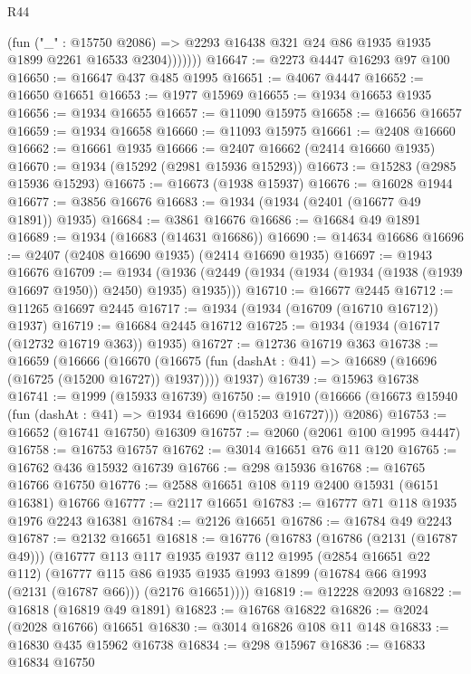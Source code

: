 \begin{lexlean}{R44}
\begin{coremodule}
                (fun ("_" : @15750 @2086) =>
                @2293 @16438 @321 @24 @86 @1935 @1935 @1899 @2261 @16533 @2304)))))))
@16647 := @2273 @4447 @16293 @97 @100
@16650 := @16647 @437 @485 @1995
@16651 := @4067 @4447
@16652 := @16650 @16651
@16653 := @1977 @15969
@16655 := @1934 @16653 @1935
@16656 := @1934 @16655
@16657 := @11090 @15975
@16658 := @16656 @16657
@16659 := @1934 @16658
@16660 := @11093 @15975
@16661 := @2408 @16660
@16662 := @16661 @1935
@16666 := @2407 @16662 (@2414 @16660 @1935)
@16670 := @1934 (@15292 (@2981 @15936 @15293))
@16673 := @15283 (@2985 @15936 @15293)
@16675 := @16673 (@1938 @15937)
@16676 := @16028 @1944
@16677 := @3856 @16676
@16683 := @1934 (@1934 (@2401 (@16677 @49 @1891)) @1935)
@16684 := @3861 @16676
@16686 := @16684 @49 @1891
@16689 := @1934 (@16683 (@14631 @16686))
@16690 := @14634 @16686
@16696 := @2407 (@2408 @16690 @1935) (@2414 @16690 @1935)
@16697 := @1943 @16676
@16709 := @1934
    (@1936 (@2449 (@1934 (@1934 (@1934 (@1938 (@1939 @16697 @1950)) @2450) @1935) @1935)))
@16710 := @16677 @2445
@16712 := @11265 @16697 @2445
@16717 := @1934 (@1934 (@16709 (@16710 @16712)) @1937)
@16719 := @16684 @2445 @16712
@16725 := @1934 (@1934 (@16717 (@12732 @16719 @363)) @1935)
@16727 := @12736 @16719 @363
@16738 := @16659
    (@16666
      (@16670 (@16675 (fun (dashAt : @41) => @16689 (@16696 (@16725 (@15200 @16727)) @1937))))
      @1937)
@16739 := @15963 @16738
@16741 := @1999 (@15933 @16739)
@16750 := @1910 (@16666 (@16673 @15940 (fun (dashAt : @41) => @1934 @16690 (@15203 @16727))) @2086)
@16753 := @16652 (@16741 @16750) @16309
@16757 := @2060 (@2061 @100 @1995 @4447)
@16758 := @16753 @16757
@16762 := @3014 @16651 @76 @11 @120
@16765 := @16762 @436 @15932 @16739
@16766 := @298 @15936
@16768 := @16765 @16766 @16750
@16776 := @2588 @16651 @108 @119 @2400 @15931 (@6151 @16381) @16766
@16777 := @2117 @16651
@16783 := @16777 @71 @118 @1935 @1976 @2243 @16381
@16784 := @2126 @16651
@16786 := @16784 @49 @2243
@16787 := @2132 @16651
@16818 := @16776
    (@16783
      (@16786 (@2131 (@16787 @49)))
      (@16777
        @113
        @117
        @1935
        @1937
        @112
        @1995
        (@2854 @16651 @22 @112)
        (@16777
          @115
          @86
          @1935
          @1935
          @1993
          @1899
          (@16784 @66 @1993 (@2131 (@16787 @66)))
          (@2176 @16651))))
@16819 := @12228 @2093
@16822 := @16818 (@16819 @49 @1891)
@16823 := @16768 @16822
@16826 := @2024 (@2028 @16766) @16651
@16830 := @3014 @16826 @108 @11 @148
@16833 := @16830 @435 @15962 @16738
@16834 := @298 @15967
@16836 := @16833 @16834 @16750

\end{coremodule}
\end{lexlean}
